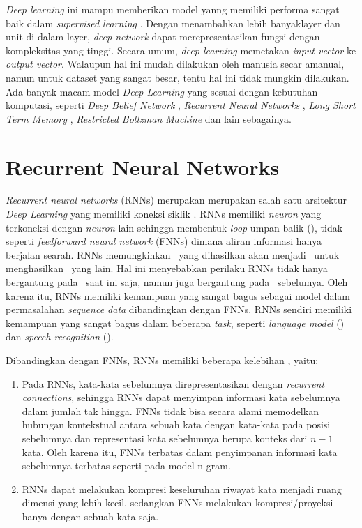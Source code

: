 \textit{Deep learning} ini mampu memberikan model yanng memiliki performa sangat baik dalam \textit{supervised learning} \citep{Goodfellow-et-al-2016-Book}. Dengan menambahkan lebih banyaklayer dan unit di dalam layer, \textit{deep network} dapat merepresentasikan fungsi dengan kompleksitas yang tinggi. Secara umum, \textit{deep learning} memetakan \textit{input vector} ke \textit{output vector}. Walaupun hal ini mudah dilakukan oleh manusia secar amanual, namun untuk dataset yang sangat besar, tentu hal ini tidak mungkin dilakukan. Ada banyak macam model \textit{Deep Learning} yang sesuai dengan kebutuhan komputasi, seperti \textit{Deep Belief Network} \citep{hinton2006fast}, \textit{Recurrent Neural Networks} \citep{elman1990finding}, \textit{Long Short Term Memory} \citep{hochreiter1997long}, \textit{Restricted Boltzman Machine} \citep{pennington2014glove} dan lain sebagainya. 

\section{Recurrent Neural Networks}\label{sec:rnns}

\textit{Recurrent neural networks} (RNNs) merupakan merupakan salah satu arsitektur \textit{Deep Learning} yang memiliki koneksi siklik \citep{graves2012neural}. RNNs memiliki \textit{neuron} yang terkoneksi dengan \textit{neuron} lain sehingga membentuk \textit{loop} umpan balik (\cite{haykin2009neural}), tidak seperti \textit{feedforward neural network} (FNNs) dimana aliran informasi hanya berjalan searah. RNNs memungkinkan \iob~yang dihasilkan akan menjadi \ioa~untuk menghasilkan \iob~yang lain. Hal ini menyebabkan perilaku RNNs tidak hanya bergantung pada \ioa~saat ini saja, namun juga bergantung pada \iob~sebelumya. Oleh karena itu, RNNs memiliki kemampuan yang sangat bagus sebagai model dalam permasalahan \textit{sequence data} dibandingkan dengan FNNs. RNNs sendiri memiliki kemampuan yang sangat bagus dalam beberapa \textit{task}, seperti \textit{language model} (\cite{mikolov2010recurrent}) dan \textit{speech recognition} (\cite{graves2013speech}).

Dibandingkan dengan FNNs, RNNs memiliki beberapa kelebihan \citep{mikolov2010recurrent}, yaitu:
\begin{enumerate}
	\item Pada RNNs, kata-kata sebelumnya direpresentasikan dengan \textit{recurrent connections}, sehingga RNNs dapat menyimpan informasi kata sebelumnya dalam jumlah tak hingga. FNNs tidak bisa secara alami memodelkan hubungan kontekstual antara sebuah kata dengan kata-kata pada posisi sebelumnya dan representasi kata sebelumnya berupa konteks dari $ n-1 $ kata. Oleh karena itu, FNNs terbatas dalam penyimpanan informasi kata sebelumnya terbatas seperti pada model n-gram.
	\item RNNs dapat melakukan kompresi keseluruhan riwayat kata menjadi ruang dimensi yang lebih kecil, sedangkan FNNs melakukan kompresi/proyeksi hanya dengan sebuah kata saja.
\end{enumerate}

